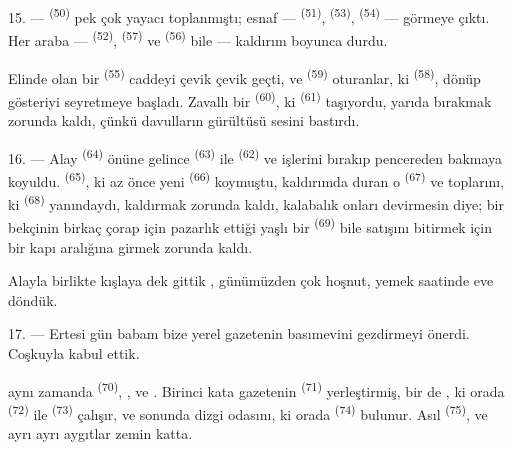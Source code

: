 15. ---  \textsuperscript{(50)} pek çok yayacı
toplanmıştı; esnaf ---  \textsuperscript{(51)},
 \textsuperscript{(53)}, 
\textsuperscript{(54)} ---  görmeye çıktı. Her araba ---
 \textsuperscript{(52)}, 
\textsuperscript{(57)} ve  \textsuperscript{(56)} bile ---
kaldırım boyunca durdu.

\VUsaut{3.0mm}

Elinde  olan bir 
\textsuperscript{(55)} caddeyi çevik çevik geçti, ve  \textsuperscript{(59)}
oturanlar, ki  \textsuperscript{(58)}, dönüp gösteriyi
seyretmeye başladı. Zavallı bir 
\textsuperscript{(60)}, ki  \textsuperscript{(61)}
taşıyordu,  yarıda bırakmak zorunda kaldı, çünkü
davulların gürültüsü sesini bastırdı.

16. --- Alay  \textsuperscript{(64)} önüne gelince
 \textsuperscript{(63)} ile 
\textsuperscript{(62)}  ve işlerini bırakıp
pencereden bakmaya koyuldu.  \textsuperscript{(65)}, ki az
önce  yeni  \textsuperscript{(66)}
koymuştu, kaldırımda duran o  \textsuperscript{(67)} ve
 toplarını, ki  \textsuperscript{(68)}
yanındaydı, kaldırmak zorunda kaldı, kalabalık onları devirmesin diye; bir bekçinin birkaç
çorap için pazarlık ettiği yaşlı bir 
\textsuperscript{(69)} bile satışını bitirmek için bir kapı aralığına girmek
zorunda kaldı.

Alayla birlikte kışlaya dek gittik , günümüzden çok hoşnut, yemek
saatinde eve döndük.

\VUsaut{3.0mm}

17. --- Ertesi gün babam bize yerel gazetenin basımevini gezdirmeyi önerdi.
Coşkuyla kabul ettik.

 aynı zamanda  \textsuperscript{(70)},
,  ve . Birinci kata
gazetenin  \textsuperscript{(71)} yerleştirmiş,
bir de , ki orada 
\textsuperscript{(72)} ile  \textsuperscript{(73)}
çalışır, ve sonunda dizgi odasını, ki orada 
\textsuperscript{(74)} bulunur. Asıl  \textsuperscript{(75)},
 ve ayrı ayrı aygıtlar zemin katta.

